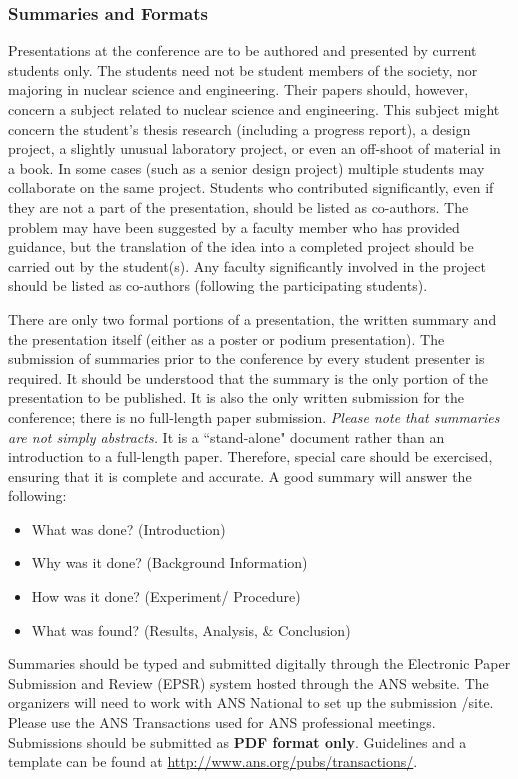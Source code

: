 \documentclass[12pt]{article}
\begin{document}
\subsubsection{Summaries and Formats}
Presentations at the conference are to be authored and presented by current students only.
The students need not be student members of the society, nor majoring in nuclear science and engineering.
Their papers should, however, concern a subject related to nuclear science and engineering.
This subject might concern the student's thesis research (including a progress report), a design project, a slightly unusual laboratory project, or even an off-shoot of material in a book.
In some cases (such as a senior design project) multiple students may collaborate on the same project.
Students who contributed significantly, even if they are not a part of the presentation, should be listed as co-authors.
The problem may have been suggested by a faculty member who has provided guidance, but the translation of the idea into a completed project should be carried out by the student(s).
Any faculty significantly involved in the project should be listed as co-authors (following the participating students).

There are only two formal portions of a presentation, the written summary and the presentation itself (either as a poster or podium presentation).
The submission of summaries prior to the conference by every student presenter is required.
It should be understood that the summary is the only portion of the presentation to be published.
It is also the only written submission for the conference; there is no full-length paper submission.
\emph{Please note that summaries are not simply abstracts.}
It is a ``stand-alone" document rather than an introduction to a full-length paper.
Therefore, special care should be exercised, ensuring that it is complete and accurate.
A good summary will answer the following:

\begin{itemize}
    \item What was done? (Introduction)
    \item Why was it done? (Background Information)
    \item How was it done? (Experiment/ Procedure)
    \item What was found? (Results, Analysis, \& Conclusion)
\end{itemize}

Summaries should be typed and submitted digitally through the Electronic Paper Submission and Review (EPSR) system hosted through the ANS website.
The organizers will need to work with ANS National to set up the submission /site.
Please use the {ANS Transactions} used for ANS professional meetings.
Submissions should be submitted as \textbf{PDF format only}. 
Guidelines and a template can be found at \href{http://www.ans.org/pubs/transactions/}{http://www.ans.org/pubs/transactions/}.
\end{document}
